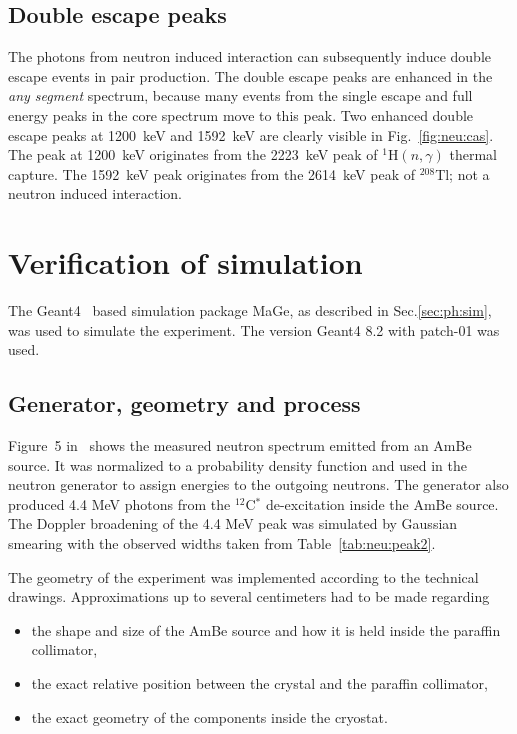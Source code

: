 \subsection{Double escape peaks}
\label{sec:neu:dep}
The photons from neutron induced interaction can subsequently induce double escape events in pair production. The double escape peaks are enhanced in the \emph{any segment} spectrum, because many events from the single escape and full energy peaks in the core spectrum move to this peak. Two enhanced double escape peaks at 1200~keV and 1592~keV are clearly visible in Fig.~\ref{fig:neu:cas}. The peak at 1200~keV originates from the 2223~keV peak of $^{1}$H$(n,\gamma)$ thermal capture. The 1592~keV peak originates from the 2614~keV peak of $^{208}$Tl; not a neutron induced interaction.


\section{Verification of simulation}
\label{sec:neu:sim}
The Geant4~\cite{Gea03,Gea06} based simulation package MaGe, as described in Sec.\ref{sec:ph:sim}, was used to simulate the experiment. The version Geant4 8.2 with patch-01 was used.

\subsection{Generator, geometry and process}
\label{sec:simdetail}
Figure~5 in~\cite{Mar95} shows the measured neutron spectrum emitted
from an AmBe source. It was normalized to a probability density
function and used in the neutron generator to assign energies to the
outgoing neutrons. The generator also produced 4.4 MeV photons from
the $^{12}$C$^{*}$ de-excitation inside the AmBe source. The Doppler
broadening of the 4.4 MeV peak was simulated by Gaussian smearing with
the observed widths taken from Table~\ref{tab:neu:peak2}.

The geometry of the experiment was implemented according to the technical drawings. Approximations up to several centimeters had to be made regarding
\begin{itemize}
\item the shape and size of the AmBe source and how it is held inside
  the paraffin collimator,
\item the exact relative position between the crystal and the paraffin
  collimator,
\item the exact geometry of the components inside the cryostat.
\end{itemize}

